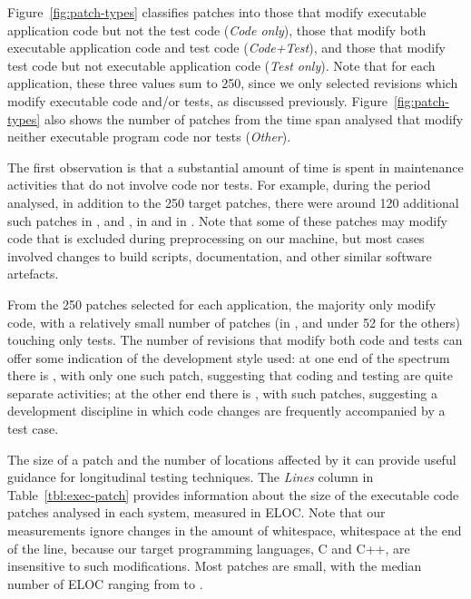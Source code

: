 Figure~\ref{fig:patch-types} classifies patches into those that modify
executable application code but not the test code (\textit{Code
only}), those that modify both executable application code and test
code (\textit{Code+Test}), and those that modify test code but not
executable application code (\textit{Test only}).  Note that for each
application, these three values sum to 250, since we only selected
revisions which modify executable code and/or tests, as discussed
previously.  Figure~\ref{fig:patch-types} also shows the number of
patches from the time span analysed that modify neither executable
program code nor tests (\textit{Other}).

The first observation is that a substantial amount of time is spent in
maintenance activities that do not involve code nor tests.  For example, during
the period analysed, in addition to the 250 target patches, there were around
120 additional such patches in \binutils, \memcached and \zeromq,
\beanstalkdNoTestNoExecutableRevs in \beanstalkd and \gitNoTestNoExecutableRevs
in \git. Note that some of these patches may modify code that is excluded
during preprocessing on our machine, but most cases involved changes to build
scripts, documentation, and other similar software artefacts.

From the 250 patches selected for each application, the majority only
modify code, with a relatively small number of patches
(\gitOnlyTestRevs in \git, and under 52 for the others) touching only
tests. The number of revisions that modify both code and tests can
offer some indication of the development style used: at one end of the
spectrum there is \redis, with only one such patch, suggesting that
coding and testing are quite separate activities; at the other end
there is \git, with \gitTestAndExecutableRevs such patches, suggesting a
development discipline in which code changes are frequently
accompanied by a test case. %




The size of a patch and the number of locations affected by it can
provide useful guidance for longitudinal testing techniques.  The
\textit{Lines} column in Table~\ref{tbl:exec-patch} provides
information about the size of the executable code patches analysed in
each system, measured in ELOC. Note that our measurements ignore
changes in the amount of whitespace, \eg whitespace at the end of the
line, %
because our target programming languages, C and C++, are insensitive
to such modifications.  Most patches are small, with the median
number of ELOC ranging from \redisPatchMedian to \gitPatchMedian.

